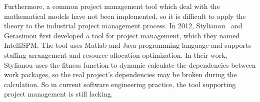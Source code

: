 Furthermore, a common project management tool which deal with
the mathematical models have not been implemented, so it is difficult to apply
the theory to the industrial project management process. In 2012, Stylianou~\cite{stylianou} and
Gerasimou first developed a tool for project management, which they named
IntelliSPM. The tool uses Matlab and Java programming language and
supports staffing arrangement and resource allocation optimization. In
their work, Stylianou uses the fitness function to dynamic calculate the
dependencies between work packages, so the real project's dependencies may be
broken during the calculation. So in current software engineering practice, the
tool supporting project management is still lacking.

